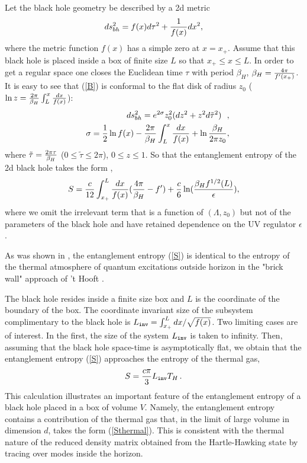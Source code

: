 \documentclass[12pt]{article}
\def\be{\begin{eqnarray}}
\def\ee{\end{eqnarray}}
\def\lb{\label}
\begin{document}
Let the black hole geometry be described by a 2d metric
\begin{equation}
ds^2_{bh}=f(x)d\tau^2+{1\over f(x)}dx^2, \label{B}
\end{equation}
where the metric function $f(x)$ has a simple zero at $x=x_+$. Assume that this black hole is placed inside a box of finite size $L$ so that
$x_+\leq x \leq L$. In order to get a regular space one closes the Euclidean time $\tau$ with period $\beta_H$, 
 $\beta_H={4\pi \over f'(x_+)}$. It is easy to see
that (\ref{B}) is conformal to the flat disk of radius $z_0$ ($\ln
z={{2\pi \over \beta_H}\int^x_L {dx \over f(x)}}$):
\begin{eqnarray}
&&ds^2_{bh}=e^{2\sigma }z_0^2(dz^2+z^2d\tilde{\tau}^2 )~~, \\
&&\sigma={1\over 2} \ln f(x)-{2\pi \over \beta_H}\int^x_L {dx\over
f(x)}
 +\ln {\beta_H  \over 2\pi z_0}, \nonumber
\label{4}
\end{eqnarray}
where
 $\tilde{\tau}={2\pi \tau \over \beta_H}$ ($0\leq \tilde{\tau} \leq2\pi$),
 $0 \leq z\leq 1$.
So that the entanglement entropy of the 2d black hole takes the form
 \cite{Solodukhin:1996vx}, \cite{Frolov:1996hd}
\begin{equation}
S={c\over 12} \int^L_{x_+}{dx \over f(x)}({4\pi \over
\beta_H}-f')+ {c\over 6}\ln ({\beta_H  f^{1/2}(L)\over \epsilon}),
\label{S}
\end{equation}
where we omit the irrelevant term that is a function of $(\Lambda
, z_0)$ but not of the parameters of the black hole and have
retained dependence on the UV regulator $\epsilon$. 

 As was shown in
\cite{Solodukhin:1996vx}, the entanglement entropy (\ref{S}) is
identical to the entropy of the thermal atmosphere of quantum
excitations outside  horizon in the "brick wall" approach of  't Hooft
\cite{'tHooft:1984re}.

The black hole resides inside a finite size box  and $L$ is the
coordinate of the boundary of the box. The coordinate invariant
size of the subsystem complimentary to the black hole is $L_{\tt
inv}=\int_{x_+}^Ldx/\sqrt{f(x)}$. Two limiting cases are of
interest.  In the first,  the size of the system $L_{\tt inv}$ is
taken to infinity. Then, assuming that the black hole space-time
is asymptotically flat, we obtain that the entanglement entropy
(\ref{S}) approaches the entropy of the thermal gas,  
\be
S={c\pi\over 3}L_{\tt inv}T_H\, .
\lb{thermal entropy-entanglement}
\ee
This calculation illustrates an important feature of the entanglement entropy of a black hole placed in a box of volume $V$. 
Namely,  the entanglement entropy contains a contribution of the thermal gas that,  in the limit of large volume in dimension $d$, 
takes the form (\ref{Sthermal}). This is consistent with the thermal nature of the reduced density matrix obtained from the Hartle-Hawking
state by tracing over modes inside the horizon.
\end{document}
